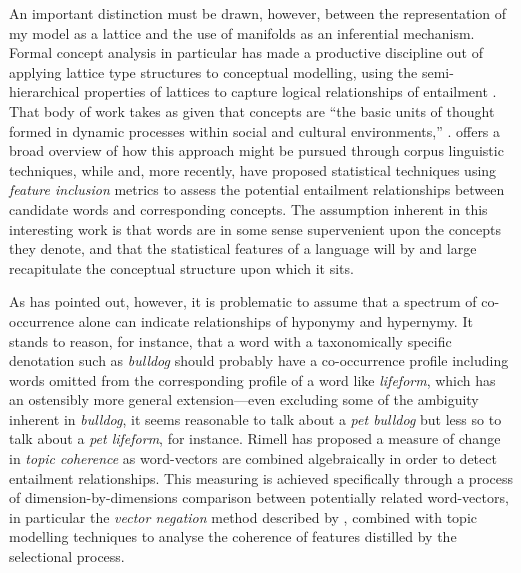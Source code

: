 An important distinction must be drawn, however, between the representation of my model as a lattice and the use of manifolds as an inferential mechanism.  Formal concept analysis in particular has made a productive discipline out of applying lattice type structures to conceptual modelling, using the semi-hierarchical properties of lattices to capture logical relationships of entailment \citep{Wille1982}.  That body of work takes as given that concepts are ``the basic units of thought formed in dynamic processes within social and cultural environments,'' \citep[][p. 2]{Wille2005}.  \cite{Widdows2004} offers a broad overview of how this approach might be pursued through corpus linguistic techniques, while \cite{GeffetEA2005} and, more recently, \cite{KartsaklisEA2016} have proposed statistical techniques using \emph{feature inclusion} metrics to assess the potential entailment relationships between candidate words and corresponding concepts.  The assumption inherent in this interesting work is that words are in some sense supervenient upon the concepts they denote, and that the statistical features of a language will by and large recapitulate the conceptual structure upon which it sits.

As \cite{Rimell2014} has pointed out, however, it is problematic to assume that a spectrum of co-occurrence alone can indicate relationships of hyponymy and hypernymy.  It stands to reason, for instance, that a word with a taxonomically specific denotation such as \emph{bulldog} should probably have a co-occurrence profile including words omitted from the corresponding profile of a word like \emph{lifeform}, which has an ostensibly more general extension---even excluding some of the ambiguity inherent in \emph{bulldog}, it seems reasonable to talk about a \emph{pet bulldog} but less so to talk about a \emph{pet lifeform}, for instance.  Rimell has proposed a measure of change in \emph{topic coherence} as word-vectors are combined algebraically in order to detect entailment relationships.  This measuring is achieved specifically through a process of dimension-by-dimensions comparison between potentially related word-vectors, in particular the \emph{vector negation} method described by \cite{Widdows2003}, combined with topic modelling techniques to analyse the coherence of features distilled by the selectional process.

